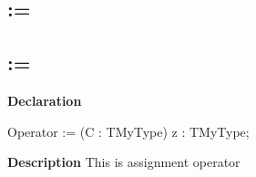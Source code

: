 \documentclass{report}
\newif\ifpdf
\begin{document}
\subsection*{\large{\textbf{:=}}\normalsize\hspace{1ex}\hrulefill}
\else
\subsection*{:=}
\fi
\label{ok_parse_impl-:=}
\index{:=}
\begin{list}{}{
\setlength{\itemindent}{0cm}
\setlength{\listparindent}{0cm}
\setlength{\leftmargin}{\evensidemargin}
\addtolength{\leftmargin}{\tmplength}
\settowidth{\labelsep}{X}
\addtolength{\leftmargin}{\labelsep}
\setlength{\labelwidth}{\tmplength}
}
\item[\textbf{Declaration}\hfill]
\ifpdf
\begin{flushleft}
\fi
\begin{ttfamily}
Operator := (C : TMyType) z : TMyType;\end{ttfamily}

\ifpdf
\end{flushleft}
\fi

\par
\item[\textbf{Description}]
This is assignment operator

\end{list}
\end{document}
